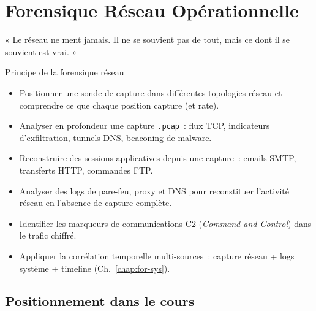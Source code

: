 
\chapter{Forensique Réseau Opérationnelle}
\label{chap:for-res}

\epigraph{%
    « Le réseau ne ment jamais. Il ne se souvient pas de tout,
    mais ce dont il se souvient est vrai. »%
}{Principe de la forensique réseau}


\begin{boxobjectifs}
\begin{itemize}
    \item Positionner une sonde de capture dans différentes topologies
          réseau et comprendre ce que chaque position capture (et rate).
    \item Analyser en profondeur une capture \texttt{.pcap}~:
          flux TCP, indicateurs d'exfiltration, tunnels DNS,
          beaconing de malware.
    \item Reconstruire des sessions applicatives depuis une capture~:
          emails SMTP, transferts HTTP, commandes FTP.
    \item Analyser des logs de pare-feu, proxy et DNS pour reconstituer
          l'activité réseau en l'absence de capture complète.
    \item Identifier les marqueurs de communications C2
          (\textit{Command and Control}) dans le trafic chiffré.
    \item Appliquer la corrélation temporelle multi-sources~:
          capture réseau + logs système + timeline (Ch.~\ref{chap:for-sys}).
\end{itemize}
\end{boxobjectifs}

\bigskip

\section*{Positionnement dans le cours}

